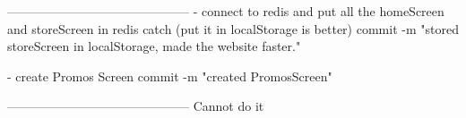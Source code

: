 --------------------------------------------
- connect to redis and put all the homeScreen and storeScreen
        in redis catch (put it in localStorage is better)
        commit -m "stored storeScreen in localStorage, made the website faster."

- create Promos Screen
        commit -m "created PromosScreen"

--------------------------------------------
Cannot do it